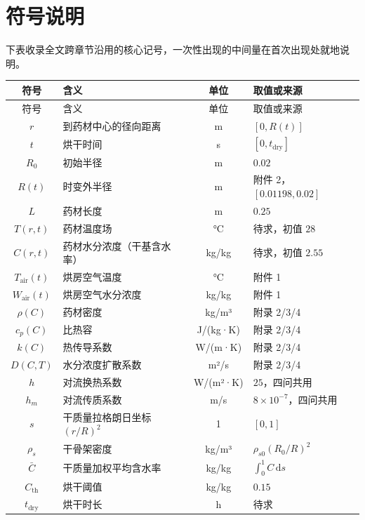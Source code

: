 \section{符号说明}

下表收录全文跨章节沿用的核心记号，一次性出现的中间量在首次出现处就地说明。

\begin{longtable}{clcl}
\toprule
符号 & 含义 & 单位 & 取值或来源 \\
\midrule
\endfirsthead
\toprule
符号 & 含义 & 单位 & 取值或来源 \\
\midrule
\endhead
\bottomrule
\endfoot
$r$ & 到药材中心的径向距离 & m & $[0,R(t)]$ \\
$t$ & 烘干时间 & s & $[0,t_{\mathrm{dry}}]$ \\
$R_0$ & 初始半径 & m & $0.02$ \\
$R(t)$ & 时变外半径 & m & 附件 2，$[0.01198,0.02]$ \\
$L$ & 药材长度 & m & $0.25$ \\
$T(r,t)$ & 药材温度场 & °C & 待求，初值 $28$ \\
$C(r,t)$ & 药材水分浓度（干基含水率） & kg/kg & 待求，初值 $2.55$ \\
$T_{\mathrm{air}}(t)$ & 烘房空气温度 & °C & 附件 1 \\
$W_{\mathrm{air}}(t)$ & 烘房空气水分浓度 & kg/kg & 附件 1 \\
$\rho(C)$ & 药材密度 & kg/m³ & 附录 2/3/4 \\
$c_p(C)$ & 比热容 & J/(kg·K) & 附录 2/3/4 \\
$k(C)$ & 热传导系数 & W/(m·K) & 附录 2/3/4 \\
$D(C,T)$ & 水分浓度扩散系数 & m²/s & 附录 2/3/4 \\
$h$ & 对流换热系数 & W/(m²·K) & $25$，四问共用 \\
$h_m$ & 对流传质系数 & m/s & $8\times10^{-7}$，四问共用 \\
$s$ & 干质量拉格朗日坐标 $(r/R)^2$ & 1 & $[0,1]$ \\
$\rho_s$ & 干骨架密度 & kg/m³ & $\rho_{s0}(R_0/R)^2$ \\
$\bar C$ & 干质量加权平均含水率 & kg/kg & $\int_0^1C\,\mathrm{d}s$ \\
$C_{\mathrm{th}}$ & 烘干阈值 & kg/kg & $0.15$ \\
$t_{\mathrm{dry}}$ & 烘干时长 & h & 待求 \\
\end{longtable}
